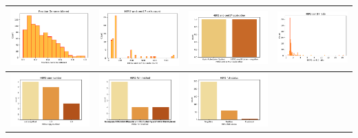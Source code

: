 \clearpage
\begin{center} 
	\begin{tabular}{ |c|c|c|c| }  
		\hline 
		\includegraphics[width=.25\textwidth]{NOTEBOOK/IMAGENES_CRUDAS/29} 
		& \includegraphics[width=.25\textwidth]{NOTEBOOK/IMAGENES_CRUDAS/30} 
		& \includegraphics[width=.25\textwidth]{NOTEBOOK/IMAGENES_CRUDAS/31} 
		& \includegraphics[width=.25\textwidth]{NOTEBOOK/IMAGENES_CRUDAS/32}   
		\\  \hline   
		\includegraphics[width=.22\textwidth]{NOTEBOOK/IMAGENES_CRUDAS/33} 
		& \includegraphics[width=.25\textwidth]{NOTEBOOK/IMAGENES_CRUDAS/34}
		& \includegraphics[width=.25\textwidth]{NOTEBOOK/IMAGENES_CRUDAS/35}

\end{tabular}
\end{center}
